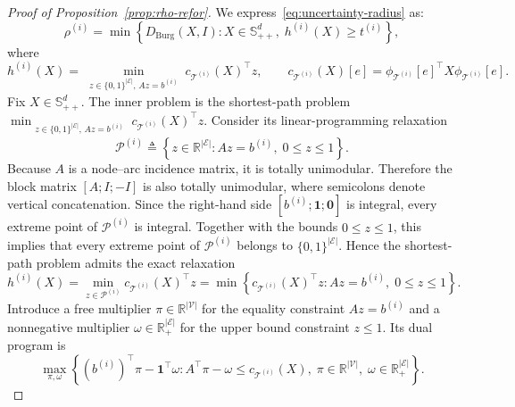 \documentclass[11pt, letterpaper, oneside, reqno]{amsart}
\newcommand{\Let}{\triangleq}
\begin{document}
\begin{proof}[Proof of Proposition~\ref{prop:rho-refor}]
We express~\eqref{eq:uncertainty-radius} as:
\[
\rho^{(i)}
= \min \left\{ D_{\mathrm{Burg}}(X,I): X\in\mathbb S_{++}^d,\; h^{(i)}(X)\ge t^{(i)} \right\},
\]
where
\[
h^{(i)}(X)
= \min_{\substack{z\in\{0,1\}^{|\mathcal E|},\, Az=b^{(i)}}} c_{\mathcal T^{(i)}}(X)^\top z,
\qquad
c_{\mathcal T^{(i)}}(X)[e]
= \phi_{\mathcal T^{(i)}}[e]^\top X\phi_{\mathcal T^{(i)}}[e].
\]
Fix $X\in\mathbb S_{++}^d$. The inner problem is the shortest-path problem
$\min_{\substack{z\in\{0,1\}^{|\mathcal E|},\, Az=b^{(i)}}} c_{\mathcal T^{(i)}}(X)^\top z$.
Consider its linear-programming relaxation
\[
\mathcal P^{(i)}
\Let \left\{z\in\mathbb R^{|\mathcal E|} : Az=b^{(i)},\; 0\le z\le 1 \right\}.
\]
Because $A$ is a node--arc incidence matrix, it is totally unimodular. Therefore the block matrix $[A; I; -I]$ is also totally unimodular, where semicolons denote vertical concatenation. Since the right-hand side $[b^{(i)}; \mathbf 1; \mathbf 0]$ is integral, every extreme point of $\mathcal P^{(i)}$ is integral. Together with the bounds $0\le z\le 1$, this implies that every extreme point of $\mathcal P^{(i)}$ belongs to $\{0,1\}^{|\mathcal E|}$. Hence the shortest-path problem admits the exact relaxation
\[
h^{(i)}(X)
= \min_{z\in\mathcal P^{(i)}} c_{\mathcal T^{(i)}}(X)^\top z
= \min\left\{
c_{\mathcal T^{(i)}}(X)^\top z :
Az=b^{(i)},\;
0\le z\le 1
\right\}.
\]
Introduce a free multiplier $\pi\in\mathbb R^{|\mathcal V|}$ for the equality constraint $Az=b^{(i)}$ and a nonnegative multiplier $\omega\in\mathbb R_+^{|\mathcal E|}$ for the upper bound constraint $z\le 1$. Its dual program is
\[
\max_{\pi,\omega}
\left\{
(b^{(i)})^\top\pi - \mathbf 1^\top\omega :
A^\top\pi-\omega\le c_{\mathcal T^{(i)}}(X),\;
\pi\in\mathbb R^{|\mathcal V|},\;
\omega\in\mathbb R_+^{|\mathcal E|}
\right\}.
\]


\end{proof}
\end{document}

